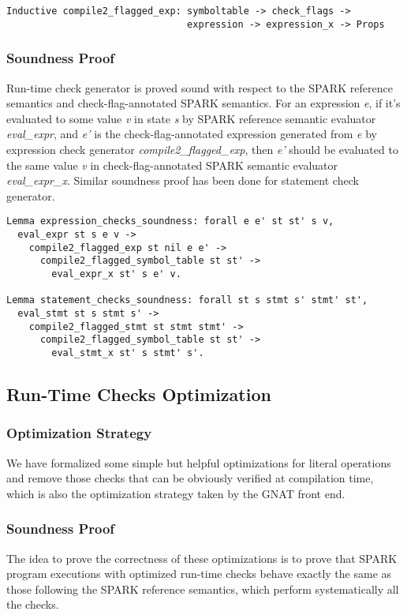 \begin{lstlisting}[escapechar=\#, language=coq, basicstyle=\small] 
Inductive compile2_flagged_exp: symboltable -> check_flags -> 
                                expression -> expression_x -> Props
\end{lstlisting}

\subsubsection{Soundness Proof}
Run-time check generator is proved sound with respect to the SPARK reference
semantics and check-flag-annotated SPARK semantics. For an expression
\textit{e}, if it's evaluated to some value \textit{v} in state \textit{s} by
SPARK reference semantic evaluator \textit{eval\_expr}, and \textit{e'} is the
check-flag-annotated expression generated from \textit{e} by expression check
generator \textit{compile2\_flagged\_exp}, then \textit{e'} should be evaluated
to the same value \textit{v} in check-flag-annotated SPARK semantic evaluator
\textit{eval\_expr\_x}. Similar soundness proof has been done for statement
check generator.

\begin{lstlisting}[escapechar=\#, language=coq, basicstyle=\small]
Lemma expression_checks_soundness: forall e e' st st' s v,
  eval_expr st s e v ->
    compile2_flagged_exp st nil e e' ->
      compile2_flagged_symbol_table st st' ->
        eval_expr_x st' s e' v.
        
Lemma statement_checks_soundness: forall st s stmt s' stmt' st',
  eval_stmt st s stmt s' -> 
    compile2_flagged_stmt st stmt stmt' ->
      compile2_flagged_symbol_table st st' ->
        eval_stmt_x st' s stmt' s'.
\end{lstlisting}

\subsection{Run-Time Checks Optimization}
\subsubsection{Optimization Strategy}
We have formalized some simple but helpful optimizations for literal operations
and remove those checks that can be obviously verified at compilation time,
which is also the optimization strategy taken by the GNAT front end. 

\subsubsection{Soundness Proof}
The idea to prove the correctness of these optimizations is to prove that SPARK
program executions with optimized run-time checks behave exactly the same as
those following the SPARK reference semantics, which perform systematically all
the checks.

